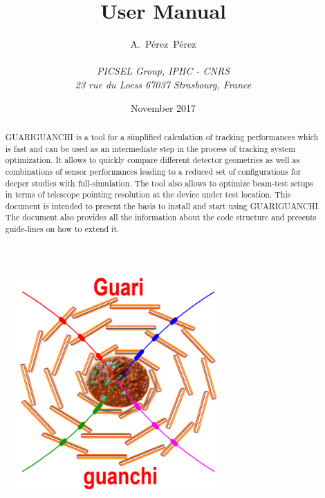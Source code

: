 \documentclass[11pt]{article}
\newif\ifcomment
\newcommand{\comment}[1]{\ifcomment \color{blue}{\underline{Comment:} #1}\color{black}\fi}
\newcommand{\guari}{GUARIGUANCHI}
\begin{document}
\sloppy 

\title{{\bf User Manual}}

\author{A.~P\'erez~P\'erez\\
~\\
{\it\footnotesize PICSEL Group, IPHC - CNRS} \\
{\it\footnotesize 23 rue du Loess 67037 Strasbourg, France}\\
}

\date{November 2017}


\begin{figure}
  \centering
  \includegraphics[width=0.7\textwidth]{figures/Guariguanchi_logo.png}
\end{figure}

\maketitle

\newpage

\begin{abstract}
{\guari} is a tool for a simplified calculation of tracking performances which is fast and can be used as an intermediate step in the process 
of tracking system optimization. It allows to quickly compare different detector geometries as well as combinations of sensor performances
leading to a reduced set of configurations for deeper studies with full-simulation. The tool also allows to optimize beam-test setups in 
terms of telescope pointing resolution at the device under test location. This document is intended to present the basis to install and start 
using \guari. The document also provides all the information about the code structure and presents guide-lines on how to extend it.
\end{abstract}

\newpage

\tableofcontents

\newpage
















\end{document}
